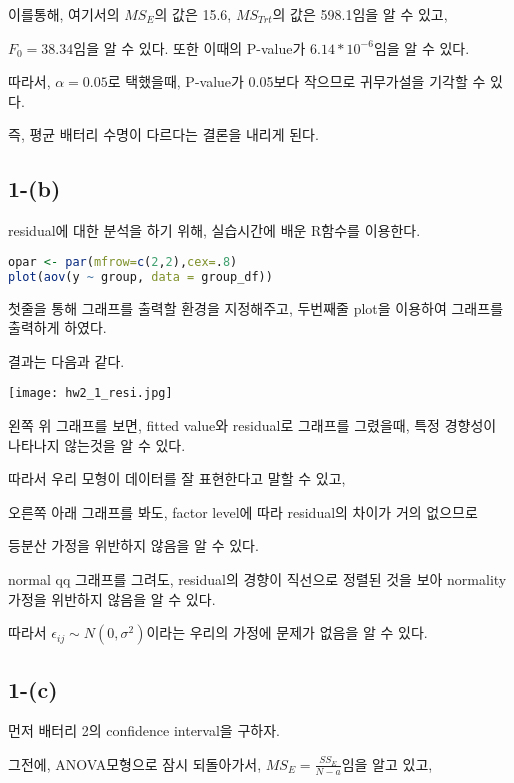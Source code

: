 \documentclass{article}
\begin{document}
이를통해, 여기서의 $MS_E$의 값은 15.6, $MS_{Trt}$의 값은 598.1임을 알 수 있고,

$F_0 = 38.34$임을 알 수 있다. 또한 이때의 P-value가  $6.14 * 10^{-6}$임을 알 수 있다.

따라서, $\alpha = 0.05$로 택했을때, P-value가 0.05보다 작으므로 귀무가설을 기각할 수 있다.

즉, 평균 배터리 수명이 다르다는 결론을 내리게 된다.
\\

\subsection{1-(b)}

residual에 대한 분석을 하기 위해, 실습시간에 배운 R함수를 이용한다.

\begin{lstlisting}[language=R]
opar <- par(mfrow=c(2,2),cex=.8)
plot(aov(y ~ group, data = group_df))
\end{lstlisting}

첫줄을 통해 그래프를 출력할 환경을 지정해주고,
두번째줄 plot을 이용하여 그래프를 출력하게 하였다.

결과는 다음과 같다.

\begin{center}
    \texttt{[image: hw2\_1\_resi.jpg]}
\end{center} 

왼쪽 위 그래프를 보면, fitted value와 residual로 그래프를 그렸을때, 특정 경향성이 나타나지 않는것을 알 수 있다. 

따라서 우리 모형이 데이터를 잘 표현한다고 말할 수 있고,

오른쪽 아래 그래프를 봐도, factor level에 따라 residual의 차이가 거의 없으므로

등분산 가정을 위반하지 않음을 알 수 있다.

normal qq 그래프를 그려도, residual의 경향이 직선으로 정렬된 것을 보아 normality 가정을 위반하지 않음을 알 수 있다.

따라서 $\epsilon_{ij} \sim N(0,\sigma^2)$이라는 우리의 가정에 문제가 없음을 알 수 있다.

\subsection{1-(c)}

먼저 배터리 2의 confidence interval을 구하자.

그전에, ANOVA모형으로 잠시 되돌아가서, $MS_E = \frac{SS_E}{N-a}$임을 알고 있고,
\end{document}
